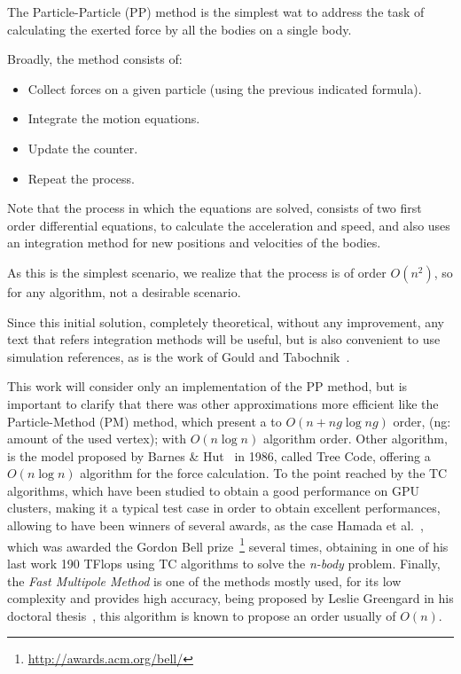 

The Particle-Particle (PP) method is the simplest wat to address
the task of calculating the exerted force by all the bodies on a single body.

Broadly, the method consists of:
\begin {itemize}
	\item Collect forces on a given particle (using the previous indicated formula).
	\item Integrate the motion equations.
	\item Update the counter.
	\item Repeat the process.
\end {itemize}

Note that the process in which the equations are solved,
consists of two first order differential equations,
to calculate the acceleration and speed,
and also uses an integration method for new positions and
velocities of the bodies.

As this is the simplest scenario,
we realize that the process is of order $O(n^{2})$,
so for any algorithm, not a desirable scenario.

Since this initial solution, completely theoretical,
without any improvement, any text that refers integration methods will be useful,
but is also convenient to use simulation references,
as is the work of Gould and Tabochnik~\cite{methods}.


This work will consider only an implementation
of the PP method, but is important to clarify
that there was other approximations more efficient
like the Particle-Method (PM) method,
which present a to $O(n + ng\log ng)$ order,
(ng: amount of the used vertex);
with $O(n\log n)$ algorithm order.
Other algorithm, is the model proposed by Barnes \& Hut~\cite{treecode} in 1986,
called Tree Code, offering a $O(n\log n)$ algorithm for the force
calculation.
To the point reached by the TC algorithms,
which have been studied to obtain a good performance
on GPU clusters, making it a typical test case
in order to obtain excellent performances,
allowing to have been winners of several awards,
as the case Hamada et al.~\cite{hamada},
which was awarded the Gordon Bell prize~\footnote{\url{http://awards.acm.org/bell/}}
several times, obtaining in one of his last work
190 TFlops using TC algorithms to solve the \emph{n-body} problem.
Finally, the \emph{Fast Multipole Method} is one of the methods
mostly used, for its low complexity and provides high accuracy,
being proposed by Leslie Greengard in his doctoral thesis~\cite{leslie},
this algorithm is known to propose an order usually of $O(n)$.

